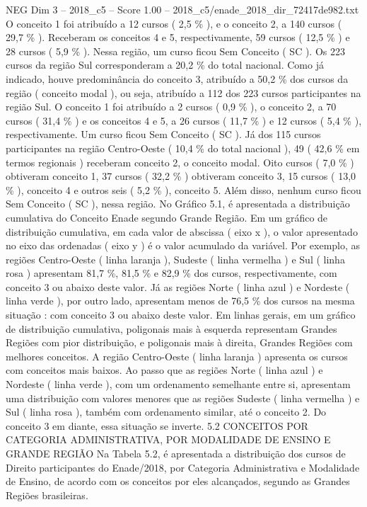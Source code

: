 \begin{textsample}{NEG Dim 3 – 2018\_c5 – Score 1.00 – 2018\_c5/enade\_2018\_dir\_72417de982.txt}
O conceito 1 foi atribuído a 12 cursos ( 2,5 \% ), e o conceito 2, a 140 cursos ( 29,7 \% ).
Receberam os conceitos 4 e 5, respectivamente, 59 cursos ( 12,5 \% ) e 28 cursos ( 5,9 \% ).
Nessa região, um curso ficou Sem Conceito ( SC ).
Os 223 cursos da região Sul corresponderam a 20,2 \% do total nacional.
Como já indicado, houve predominância do conceito 3, atribuído a 50,2 \% dos cursos da região ( conceito modal ), ou seja, atribuído a 112 dos 223 cursos participantes na região Sul.
O conceito 1 foi atribuído a 2 cursos ( 0,9 \% ), o conceito 2, a 70 cursos ( 31,4 \% ) e os conceitos 4 e 5, a 26 cursos ( 11,7 \% ) e 12 cursos ( 5,4 \% ), respectivamente.
Um curso ficou Sem Conceito ( SC ).
Já dos 115 cursos participantes na região Centro-Oeste ( 10,4 \% do total nacional ), 49 ( 42,6 \% em termos regionais ) receberam conceito 2, o conceito modal.
Oito cursos ( 7,0 \% ) obtiveram conceito 1, 37 cursos ( 32,2 \% ) obtiveram conceito 3, 15 cursos ( 13,0 \% ), conceito 4 e outros seis ( 5,2 \% ), conceito 5.
Além disso, nenhum curso ficou Sem Conceito ( SC ), nessa região.
No Gráfico 5.1, é apresentada a distribuição cumulativa do Conceito Enade segundo Grande Região.
Em um gráfico de distribuição cumulativa, em cada valor de abscissa ( eixo x ), o valor apresentado no eixo das ordenadas ( eixo y ) é o valor acumulado da variável.
Por exemplo, as regiões Centro-Oeste ( linha laranja ), Sudeste ( linha vermelha ) e Sul ( linha rosa ) apresentam 81,7 \%, 81,5 \% e 82,9 \% dos cursos, respectivamente, com conceito 3 ou abaixo deste valor.
Já as regiões Norte ( linha azul ) e Nordeste ( linha verde ), por outro lado, apresentam menos de 76,5 \% dos cursos na mesma situação : com conceito 3 ou abaixo deste valor.
Em linhas gerais, em um gráfico de distribuição cumulativa, poligonais mais à esquerda representam Grandes Regiões com pior distribuição, e poligonais mais à direita, Grandes Regiões com melhores conceitos.
A região Centro-Oeste ( linha laranja ) apresenta os cursos com conceitos mais baixos.
Ao passo que as regiões Norte ( linha azul ) e Nordeste ( linha verde ), com um ordenamento semelhante entre si, apresentam uma distribuição com valores menores que as regiões Sudeste ( linha vermelha ) e Sul ( linha rosa ), também com ordenamento similar, até o conceito 2.
Do conceito 3 em diante, essa situação se inverte. 5.2 CONCEITOS POR CATEGORIA ADMINISTRATIVA, POR MODALIDADE DE ENSINO E GRANDE REGIÃO Na Tabela 5.2, é apresentada a distribuição dos cursos de Direito participantes do Enade/2018, por Categoria Administrativa e Modalidade de Ensino, de acordo com os conceitos por eles alcançados, segundo as Grandes Regiões brasileiras.

\end{textsample}
